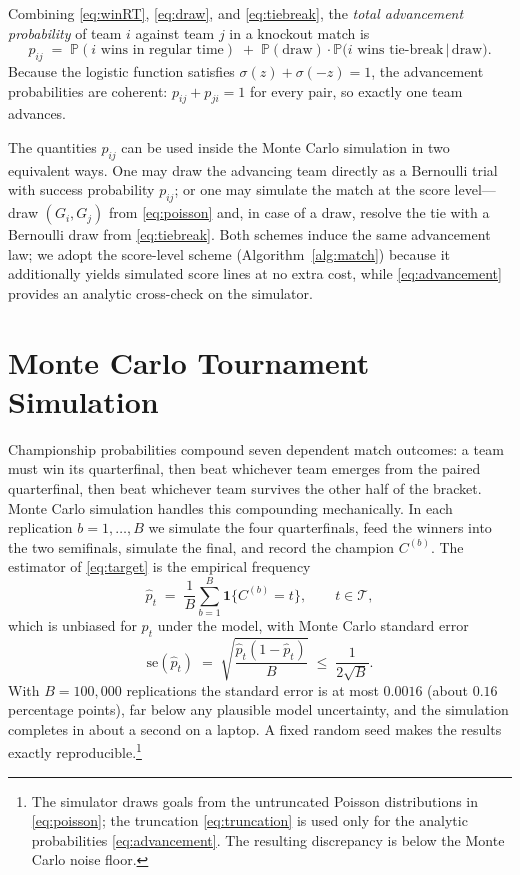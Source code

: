 \documentclass[11pt]{article}
\newcommand{\Prob}{\mathbb{P}}
\newcommand{\Ind}{\mathbf{1}}
\begin{document}
Combining \eqref{eq:winRT}, \eqref{eq:draw}, and \eqref{eq:tiebreak}, the
\emph{total advancement probability} of team $i$ against team $j$ in a
knockout match is
\begin{equation}
p_{ij}
\;=\;
\Prob(i \text{ wins in regular time})
\;+\;
\Prob(\text{draw}) \cdot
\Prob\bigl(i \text{ wins tie-break} \,\big|\, \text{draw}\bigr).
\label{eq:advancement}
\end{equation}
Because the logistic function satisfies
$\sigma(z) + \sigma(-z) = 1$, the advancement probabilities are coherent:
$p_{ij} + p_{ji} = 1$ for every pair, so exactly one team advances.

The quantities $p_{ij}$ can be used inside the Monte Carlo simulation in two
equivalent ways. One may draw the advancing team directly as a Bernoulli
trial with success probability $p_{ij}$; or one may simulate the match at the
score level---draw $(G_i, G_j)$ from \eqref{eq:poisson} and, in case of a
draw, resolve the tie with a Bernoulli draw from \eqref{eq:tiebreak}. Both
schemes induce the same advancement law; we adopt the score-level scheme
(Algorithm~\ref{alg:match}) because it additionally yields simulated score
lines at no extra cost, while \eqref{eq:advancement} provides an analytic
cross-check on the simulator.

\section{Monte Carlo Tournament Simulation}
\label{sec:mc}

Championship probabilities compound seven dependent match outcomes: a team
must win its quarterfinal, then beat whichever team emerges from the paired
quarterfinal, then beat whichever team survives the other half of the
bracket. Monte Carlo simulation handles this compounding mechanically. In
each replication $b = 1, \dots, B$ we simulate the four quarterfinals, feed
the winners into the two semifinals, simulate the final, and record the
champion $C^{(b)}$. The estimator of \eqref{eq:target} is the empirical
frequency
\begin{equation}
\hat{p}_t \;=\; \frac{1}{B} \sum_{b=1}^{B} \Ind\{C^{(b)} = t\},
\qquad t \in \mathcal{T},
\label{eq:mcestimator}
\end{equation}
which is unbiased for $p_t$ under the model, with Monte Carlo standard error
\begin{equation}
\mathrm{se}(\hat{p}_t) \;=\; \sqrt{\frac{\hat{p}_t (1 - \hat{p}_t)}{B}}
\;\le\; \frac{1}{2\sqrt{B}}.
\label{eq:mcse}
\end{equation}
With $B = 100{,}000$ replications the standard error is at most $0.0016$
(about $0.16$ percentage points), far below any plausible model
uncertainty, and the simulation completes in about a second on a laptop. A
fixed random seed makes the results exactly reproducible.\footnote{The
simulator draws goals from the untruncated Poisson distributions in
\eqref{eq:poisson}; the truncation \eqref{eq:truncation} is used only for the
analytic probabilities \eqref{eq:advancement}. The resulting discrepancy is
below the Monte Carlo noise floor.}
\end{document}
